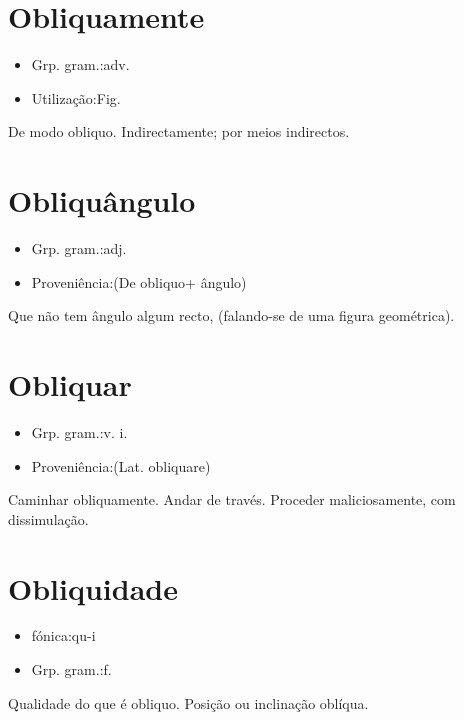 \section{Obliquamente}
\begin{itemize}
\item {Grp. gram.:adv.}
\end{itemize}
\begin{itemize}
\item {Utilização:Fig.}
\end{itemize}
De modo obliquo.
Indirectamente; por meios indirectos.
\section{Obliquângulo}
\begin{itemize}
\item {Grp. gram.:adj.}
\end{itemize}
\begin{itemize}
\item {Proveniência:(De \textunderscore obliquo\textunderscore  + \textunderscore ângulo\textunderscore )}
\end{itemize}
Que não tem ângulo algum recto, (falando-se de uma figura geométrica).
\section{Obliquar}
\begin{itemize}
\item {Grp. gram.:v. i.}
\end{itemize}
\begin{itemize}
\item {Proveniência:(Lat. \textunderscore obliquare\textunderscore )}
\end{itemize}
Caminhar obliquamente.
Andar de través.
Proceder maliciosamente, com dissimulação.
\section{Obliquidade}
\begin{itemize}
\item {fónica:qu-i}
\end{itemize}
\begin{itemize}
\item {Grp. gram.:f.}
\end{itemize}
Qualidade do que é obliquo.
Posição ou inclinação oblíqua.

